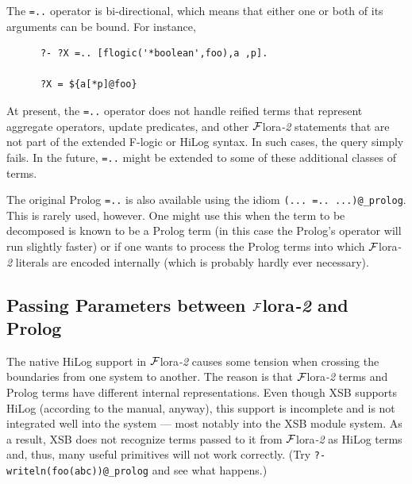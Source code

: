 \documentclass[11pt]{article}
\newcommand{\FLORA}{{\mbox{\sc ${\cal F}${lora}\rm\emph{-2}}}\xspace}
\begin{document}
The {\tt =..} operator is bi-directional, which means that either one or
both of its arguments can be bound. For instance, 
\begin{verbatim}
      ?- ?X =.. [flogic('*boolean',foo),a ,p].
 
      ?X = ${a[*p]@foo}
\end{verbatim}

At present, the {\tt =..}  operator does not handle reified terms that
represent aggregate operators, update predicates, and other \FLORA
statements that are not part of the extended F-logic or HiLog syntax.
In such cases, the query simply fails.
In the future, {\tt =..} might be extended to some of these additional
classes of terms. 

The original Prolog {\tt =..} is also available using the idiom 
{\tt (... =.. ...)@\_prolog}.  This is rarely used, however. One might use
this when the term to be decomposed is known to be a Prolog term (in this
case the Prolog's operator will run slightly faster) or if one wants to
process the Prolog terms into which \FLORA literals are encoded internally
(which is probably hardly ever necessary).


\subsection{Passing Parameters between \FLORA and Prolog}\label{sec-passing-args}

The native HiLog support in \FLORA causes some tension when crossing the
boundaries from one system to another. The reason is that \FLORA terms and Prolog
terms have different internal representations. Even though XSB supports
HiLog (according to the manual, anyway), this support is incomplete and is
not integrated well into the system --- most notably into the XSB module
system. As a result, XSB does not recognize terms passed to it from \FLORA
as HiLog terms and, thus, many useful primitives will not work correctly.
(Try {\tt ?- writeln(foo(abc))@\_prolog} and see what happens.)
\end{document}

